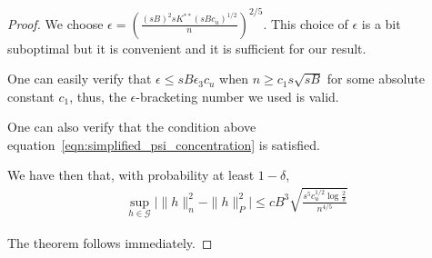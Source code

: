 \begin{proof}
We choose $\epsilon = \left( \frac{ (sB)^2 sK^{**} (sBc_u)^{1/2}}{n} \right)^{2/5}$. This choice of $\epsilon$ is a bit suboptimal but it is convenient and it is sufficient for our result.

One can easily verify that $\epsilon \leq sB \epsilon_3 c_u$ when $n \geq c_1 s \sqrt{sB}$ for some absolute constant $c_1$, thus, the $\epsilon$-bracketing number we used is valid. 

One can also verify that the condition above equation~\ref{eqn:simplified_psi_concentration} is satisfied. 

We have then that, with probability at least $1-\delta$,
\begin{align*}
\sup_{h \in \mathcal{G}} \big| \| h \|_n^2 - \| h \|_P^2  \big| \leq
  c B^3 \sqrt{ \frac{s^5 c_u^{1/2} \log \frac{2}{\delta}}{n^{4/5}}}
\end{align*}

The theorem follows immediately.







\end{proof}
